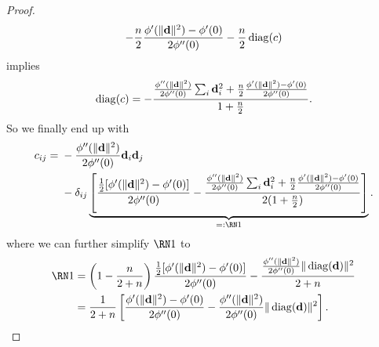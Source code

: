 \begin{proof}
\begin{equation*}
		- \frac{n}2\frac{\phi'(\|\mathbf{d}\|^2) - \phi'(0)}{2\phi''(0)}
		- \frac{n}2 \operatorname{diag}(c)
	\end{equation*}
	implies
	\begin{equation*}
		\operatorname{diag}(c)
		= - \frac{
			\frac{\phi''(\|\mathbf{d}\|^2)}{2\phi''(0)}\sum_{i}\mathbf{d}_i^2
			+ \frac{n}2\frac{\phi'(\|\mathbf{d}\|^2) - \phi'(0)}{2\phi''(0)}
		}{1+\frac{n}2}.
	\end{equation*}
	So we finally end up with
	\begin{equation*}
		c_{ij} =
		\begin{aligned}[t]
			&- \frac{\phi''(\|\step\|^2)}{2\phi''(0)}\step_i\step_j\\
			&- \delta_{ij}\underbrace{\left[
			\frac{\tfrac12[\phi'(\|\step\|^2)-\phi'(0)]}{2\phi''(0)}
			- \frac{
				\frac{\phi''(\|\step\|^2)}{2\phi''(0)}\sum_{i}\step_i^2
				+ \frac{\dimension}2\frac{\phi'(\|\step\|^2) - \phi'(0)}{2\phi''(0)}
			}{2(1+\frac{\dimension}2)}
			\right]}_{=:\Rom{1}}.
		\end{aligned}
	\end{equation*}
	where we can further simplify \(\Rom{1}\) to
	\begin{align*}
		\Rom{1}
		&= 
		\left(1- \frac{\dimension}{2+\dimension}\right)\frac{\tfrac12[\phi'(\|\step\|^2)-\phi'(0)]}{2\phi''(0)}
		- \frac{
			\frac{\phi''(\|\step\|^2)}{2\phi''(0)}\|\diag(\step)\|^2
		}{2+\dimension}\\
		&= \frac1{2+\dimension}\left[
		\frac{\phi'(\|\step\|^2)-\phi'(0)}{2\phi''(0)}
		-
			\frac{\phi''(\|\step\|^2)}{2\phi''(0)}\|\diag(\step)\|^2
		\right].
		\qedhere
	\end{align*}
\end{proof}
